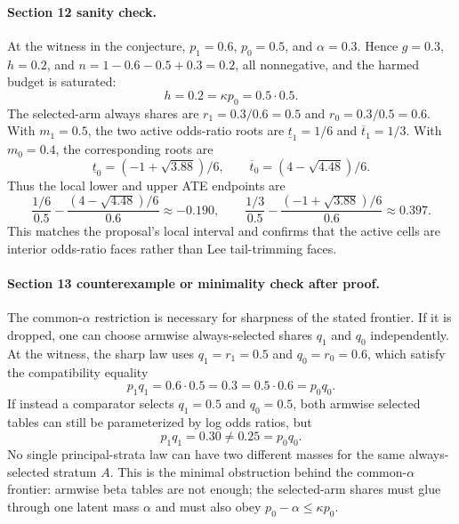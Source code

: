 \paragraph{Section 12 sanity check.}
At the witness in the conjecture, \(p_1=0.6\), \(p_0=0.5\), and
\(\alpha=0.3\).  Hence \(g=0.3\), \(h=0.2\), and
\(n=1-0.6-0.5+0.3=0.2\), all nonnegative, and the harmed budget is saturated:
\[
  h=0.2=\kappa p_0=0.5\cdot 0.5 .
\]
The selected-arm always shares are \(r_1=0.3/0.6=0.5\) and
\(r_0=0.3/0.5=0.6\).  With \(m_1=0.5\), the two active odds-ratio roots are
\(\underline t_1=1/6\) and \(\overline t_1=1/3\).  With \(m_0=0.4\), the
corresponding roots are
\[
  \underline t_0=(-1+\sqrt{3.88})/6,\qquad
  \overline t_0=(4-\sqrt{4.48})/6 .
\]
Thus the local lower and upper ATE endpoints are
\[
  \frac{1/6}{0.5}-\frac{(4-\sqrt{4.48})/6}{0.6}
  \approx -0.190,
  \qquad
  \frac{1/3}{0.5}-\frac{(-1+\sqrt{3.88})/6}{0.6}
  \approx 0.397 .
\]
This matches the proposal's local interval and confirms that the active cells
are interior odds-ratio faces rather than Lee tail-trimming faces.

\paragraph{Section 13 counterexample or minimality check after proof.}
The common-\(\alpha\) restriction is necessary for sharpness of the stated
frontier.  If it is dropped, one can choose armwise always-selected shares
\(q_1\) and \(q_0\) independently.  At the witness, the sharp law uses
\(q_1=r_1=0.5\) and \(q_0=r_0=0.6\), which satisfy the compatibility equality
\[
  p_1q_1=0.6\cdot 0.5=0.3
  =
  0.5\cdot 0.6=p_0q_0 .
\]
If instead a comparator selects \(q_1=0.5\) and \(q_0=0.5\), both armwise
selected tables can still be parameterized by log odds ratios, but
\[
  p_1q_1=0.30\ne 0.25=p_0q_0 .
\]
No single principal-strata law can have two different masses for the same
always-selected stratum \(A\).  This is the minimal obstruction behind the
common-\(\alpha\) frontier: armwise beta tables are not enough; the selected-arm
shares must glue through one latent mass \(\alpha\) and must also obey
\(p_0-\alpha\le \kappa p_0\).
